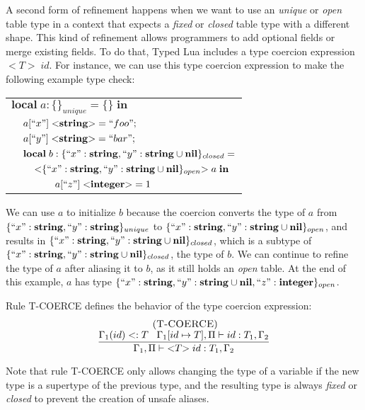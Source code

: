 \documentclass{sigplanconf}
\newcommand{\Nil}{\mathbf{nil}}
\newcommand{\Integer}{\mathbf{integer}}
\newcommand{\String}{\mathbf{string}}
\newcommand{\mylabel}[1]{\; (\textsc{#1})}
\newcommand{\env}{\Gamma}
\newcommand{\penv}{\Pi}
\newcommand{\subtype}{<:}
\begin{document}
A second form of refinement happens when we want to use an
\emph{unique} or \emph{open} table type in a context that expects a
\emph{fixed} or \emph{closed} table type with a different shape.
This kind of refinement allows programmers to add optional fields
or merge existing fields.
To do that, Typed Lua includes a type coercion expression ${<}T{>} \; id$.
For instance, we can use this type coercion expression to make the following
example type check:
\begin{center}
\begin{tabular}{llll}
\multicolumn{4}{l}{$\mathbf{local} \; a:\{\}_{unique} = \{ \} \; \mathbf{in}$}\\
& \multicolumn{3}{l}{$a[``x"] \; {<}\String{>} = ``foo";$}\\
& \multicolumn{3}{l}{$a[``y"] \; {<}\String{>} = ``bar";$}\\
& \multicolumn{3}{l}{$\mathbf{local} \; b:\{``x":\String, ``y":\String \cup \Nil \}_{closed} =$}\\
& & \multicolumn{2}{l}{${<}\{``x":\String, ``y":\String \cup \Nil\}_{open}{>} \; a \; \mathbf{in}$}\\
& & & \multicolumn{1}{l}{$a[``z"] \; {<}\Integer{>} = 1$}
\end{tabular}
\end{center}

We can use $a$ to initialize $b$ because the coercion converts
the type of $a$ from $\{``x":\String, ``y":\String\}_{unique}$ to
$\{``x":\String, ``y":\String \cup \Nil\}_{open}$, and results in
$\{``x":\String, ``y":\String \cup \Nil\}_{closed}$,
which is a subtype of
$\{``x":\String, ``y":\String \cup \Nil\}_{closed}$, the type of $b$.
We can continue to refine the type of $a$ after aliasing it to $b$,
as it still holds an \emph{open} table.
At the end of this example, $a$ has type
$\{``x":\String, ``y":\String \cup \Nil, ``z":\Integer\}_{open}$.

Rule \textsc{T-COERCE} defines the behavior of the type coercion expression:
\[
\begin{array}{c}
\mylabel{T-COERCE}\\
\dfrac{\env_{1}(id) \subtype T \;\;\;
       \env_{1}[id \mapsto T], \penv \vdash id:T_{1}, \env_{2}}
      {\env_{1}, \penv \vdash {<}T{>} \; id:T_{1}, \env_{2}}
\end{array}
\]

Note that rule \textsc{T-COERCE} only allows changing the type
of a variable if the new type is a supertype of the previous type,
and the resulting type is always \emph{fixed} or \emph{closed}
to prevent the creation of unsafe aliases.
\end{document}
